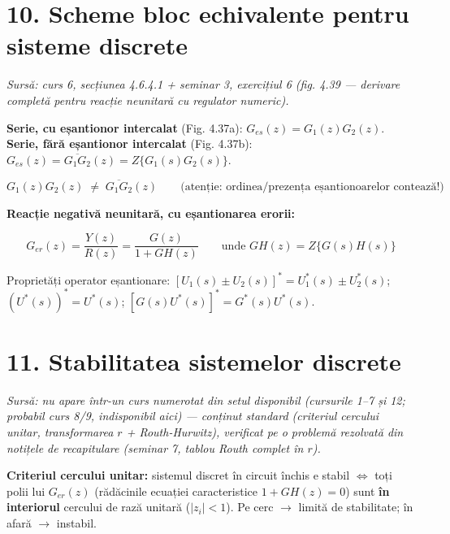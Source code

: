 \documentclass[10pt,a4paper]{article}
\newcommand{\srcnote}[1]{{\footnotesize\color{gray!55!black}\textit{Sursă: #1}}\par}
\begin{document}
\begin{center}
\end{center}

\section*{10. Scheme bloc echivalente pentru sisteme discrete}\label{sec:10}
\srcnote{curs 6, secțiunea 4.6.4.1 + seminar 3, exercițiul 6 (fig. 4.39 — derivare completă pentru reacție neunitară cu regulator numeric).}
\textbf{Serie, cu eșantionor intercalat} (Fig. 4.37a): $G_{es}(z)=G_1(z)G_2(z)$.\\
\textbf{Serie, fără eșantionor intercalat} (Fig. 4.37b): $G_{es}(z)=\overline{G_1G_2}(z)=Z\{G_1(s)G_2(s)\}$.
\begin{keyeq}\color{red!65!black}
$$G_1(z)G_2(z)\;\ne\;\overline{G_1G_2}(z)\qquad\text{(atenție: ordinea/prezența eșantionoarelor contează!)}$$
\end{keyeq}
\textbf{Reacție negativă neunitară, cu eșantionarea erorii:}
\begin{keyeq}\color{red!65!black}
$$G_{er}(z)=\dfrac{Y(z)}{R(z)}=\dfrac{G(z)}{1+GH(z)}\qquad\text{unde } GH(z)=Z\{G(s)H(s)\}$$
\end{keyeq}
Proprietăți operator eșantionare: $[U_1(s){\pm}U_2(s)]^*=U_1^*(s){\pm}U_2^*(s)$; $(U^*(s))^*=U^*(s)$; $[G(s)U^*(s)]^*=G^*(s)U^*(s)$.

\section*{11. Stabilitatea sistemelor discrete}\label{sec:11}
\srcnote{nu apare într-un curs numerotat din setul disponibil (cursurile 1–7 și 12; probabil curs 8/9, indisponibil aici) — conținut standard (criteriul cercului unitar, transformarea $r$ + Routh-Hurwitz), verificat pe o problemă rezolvată din notițele de recapitulare (seminar 7, tablou Routh complet în $r$).}
\textbf{Criteriul cercului unitar:} sistemul discret în circuit închis e stabil $\iff$ toți polii lui $G_{er}(z)$ (rădăcinile ecuației caracteristice $1+GH(z)=0$) sunt \textbf{în interiorul} cercului de rază unitară ($|z_i|<1$). Pe cerc $\to$ limită de stabilitate; în afară $\to$ instabil.
\end{document}
